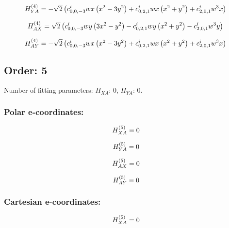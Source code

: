 \documentclass[fleqn]{article}
\begin{document}
\begin{dmath*}
H_{YA}^{(4)}=-  \sqrt{2} \left( c^{i}_{0,0,-3} w x \left(x^{2} - 3 y^{2}\right) +  c^{i}_{0,2,1} w x \left(x^{2} + y^{2}\right) +  c^{i}_{2,0,1} w^{3} x\right)\\
\end{dmath*}

\begin{dmath*}
H_{AX}^{(4)}=\sqrt{2} \left(c^{i}_{0,0,-3} w y \left(3 x^{2} - y^{2}\right) - c^{i}_{0,2,1} w y \left(x^{2} + y^{2}\right) - c^{i}_{2,0,1} w^{3} y\right)\\
\end{dmath*}

\begin{dmath*}
H_{AY}^{(4)}=-  \sqrt{2} \left( c^{i}_{0,0,-3} w x \left(x^{2} - 3 y^{2}\right) +  c^{i}_{0,2,1} w x \left(x^{2} + y^{2}\right) +  c^{i}_{2,0,1} w^{3} x\right)\\
\end{dmath*}
\subsection{Order: 5}
Number of fitting parameters: $H_{XA}$: $0$, $H_{YA}$: $0$.
\subsubsection*{Polar e-coordinates:}

\begin{dmath*}
H_{XA}^{(5)}=0\\
\end{dmath*}

\begin{dmath*}
H_{YA}^{(5)}=0\\
\end{dmath*}

\begin{dmath*}
H_{AX}^{(5)}=0\\
\end{dmath*}

\begin{dmath*}
H_{AY}^{(5)}=0\\
\end{dmath*}
\subsubsection*{Cartesian e-coordinates:}

\begin{dmath*}
H_{XA}^{(5)}=0\\
\end{dmath*}
\end{document}
